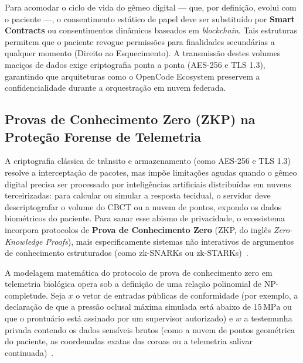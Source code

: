 Para acomodar o ciclo de vida do gêmeo digital — que, por definição, evolui com o paciente —, o consentimento estático de papel deve ser substituído por \textbf{Smart Contracts} ou consentimentos dinâmicos baseados em \textit{blockchain}. Tais estruturas permitem que o paciente revogue permissões para finalidades secundárias a qualquer momento (Direito ao Esquecimento). A transmissão destes volumes maciços de dados exige criptografia ponta a ponta (AES-256 e TLS 1.3), garantindo que arquiteturas como o OpenCode Ecosystem preservem a confidencialidade durante a orquestração em nuvem federada.

\subsection{Provas de Conhecimento Zero (ZKP) na Proteção Forense de Telemetria}

A criptografia clássica de trânsito e armazenamento (como AES-256 e TLS 1.3) resolve a interceptação de pacotes, mas impõe limitações agudas quando o gêmeo digital precisa ser processado por inteligências artificiais distribuídas em nuvens terceirizadas: para calcular ou simular a resposta tecidual, o servidor deve descriptografar o volume do CBCT ou a nuvem de pontos, expondo os dados biométricos do paciente. Para sanar esse abismo de privacidade, o ecossistema incorpora protocolos de \textbf{Prova de Conhecimento Zero} (ZKP, do inglês \textit{Zero-Knowledge Proofs}), mais especificamente sistemas não interativos de argumentos de conhecimento estruturados (como zk-SNARKs ou zk-STARKs)~\cite{springer2026realising}.

A modelagem matemática do protocolo de prova de conhecimento zero em telemetria biológica opera sob a definição de uma relação polinomial de NP-completude. Seja $x$ o vetor de entradas públicas de conformidade (por exemplo, a declaração de que a pressão oclusal máxima simulada está abaixo de $15\,\text{MPa}$ ou que o prontuário está assinado por um supervisor autorizado) e $w$ a testemunha privada contendo os dados sensíveis brutos (como a nuvem de pontos geométrica do paciente, as coordenadas exatas das coroas ou a telemetria salivar continuada)~\cite{cuadros2023access}.

